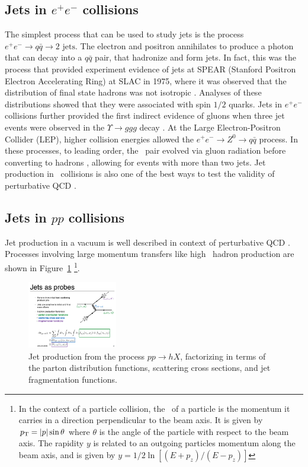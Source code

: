 \subsection{Jets in $e^+ e^-$ collisions}
The simplest process that can be used to study jets is the process $e^+ e^- \rightarrow q \bar{q} \rightarrow 2 \text{ jets}$.
The electron and positron annihilates to produce a photon that can decay into a $q \bar{q}$ pair, that hadronize and form jets.
In fact, this was the process that provided experiment evidence of jets at SPEAR (Stanford Positron Electron Accelerating Ring) at SLAC in 1975, where it was observed that the distribution of final state hadrons was not isotropic \cite{PhysRevLett.35.1609, PhysRevD.26.991}.
Analyses of these distributions showed that they were associated with spin $1/2$ quarks.
Jets in $e^+ e^-$ collisions further provided the first indirect evidence of gluons when three jet events were observed in the $\Upsilon \rightarrow ggg$ decay \cite{Berger:1978rr, Berger:1979cj}. 
At the Large Electron-Positron Collider (LEP), higher collision energies allowed the $e^+ e^- \rightarrow Z^0 \rightarrow q \bar{q}$ process.
In these processes, to leading order, the \qqbar\ pair evolved via gluon radiation before converting to hadrons \cite{Mueller_1991}, allowing for events with more than two jets.
Jet production in \epm\ collisions is also one of the best ways to test the validity of perturbative QCD \cite{Kramer:1986mc}.

\subsection{Jets in $pp$ collisions}
Jet production in a vacuum is well described in context of perturbative QCD \cite{Sjostrand:2007gs}.
Processes involving large momentum transfers like high \pt\ hadron production are shown in Figure~\ref{fig:feynman_jet}
\footnote{In the context of a particle collision, the \pt\ of a particle is the momentum it carries in a direction perpendicular to the beam axis.
It is given by $\mbox{$p_{\mathrm{T}}$} = |p| \sin\theta$ where $\theta$ is the angle of the particle with respect to the beam axis.
The rapidity $y$ is related to an outgoing particles momentum along the beam axis, and is given by $y = 1/2 \ln[(E+p_z) / (E-p_z)]$}.

\begin{figure}[htbp]
\begin{center}
\includegraphics[width=0.35\textwidth]{figures/theory/feynman_jet}
\caption{Jet production from the process $pp \rightarrow hX$, factorizing in terms of the parton distribution functions, scattering cross sections, and jet fragmentation functions.}
\label{fig:feynman_jet}
\end{center}
\end{figure}

